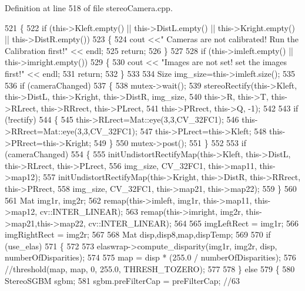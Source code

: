 Definition at line 518 of file stereo\+Camera.\+cpp.


\begin{DoxyCode}
521 \{
522     \textcolor{keywordflow}{if} (this->Kleft.empty() || this->DistL.empty() || this->Kright.empty() || this->DistR.empty())
523     \{
524         cout <<\textcolor{stringliteral}{" Cameras are not calibrated! Run the Calibration first!"} << endl;
525         \textcolor{keywordflow}{return};
526     \}
527 
528     \textcolor{keywordflow}{if} (this->imleft.empty() || this->imright.empty())
529     \{
530         cout << \textcolor{stringliteral}{"Images are not set! set the images first!"} << endl;
531         \textcolor{keywordflow}{return};
532     \}
533 
534     Size img\_size=this->imleft.size();
535 
536     \textcolor{keywordflow}{if} (cameraChanged)
537     \{
538         mutex->wait();
539         stereoRectify(this->Kleft, this->DistL, this->Kright, this->DistR, img\_size,
540                       this->R, this->T, this->RLrect, this->RRrect, this->PLrect,
541                       this->PRrect, this->Q, -1);
542 
543         \textcolor{keywordflow}{if} (!rectify)
544         \{
545             this->RLrect=Mat::eye(3,3,CV\_32FC1);
546             this->RRrect=Mat::eye(3,3,CV\_32FC1);
547             this->PLrect=this->Kleft;
548             this->PRrect=this->Kright;
549         \}
550         mutex->post();
551     \}
552 
553     \textcolor{keywordflow}{if} (cameraChanged)
554     \{
555         initUndistortRectifyMap(this->Kleft, this->DistL, this->RLrect, this->PLrect,
556                                 img\_size, CV\_32FC1, this->map11, this->map12);
557         initUndistortRectifyMap(this->Kright,  this->DistR, this->RRrect, this->PRrect,
558                                 img\_size, CV\_32FC1, this->map21, this->map22);
559     \}
560     
561     Mat img1r, img2r;
562     remap(this->imleft, img1r, this->map11, this->map12, cv::INTER\_LINEAR);
563     remap(this->imright, img2r, this->map21,this->map22, cv::INTER\_LINEAR);
564 
565     imgLeftRect = img1r;
566     imgRightRect = img2r;
567 
568     Mat disp,disp8,map,dispTemp;
569 
570     \textcolor{keywordflow}{if} (use\_elas)
571     \{
572         
573         elaswrap->compute\_disparity(img1r, img2r, disp, numberOfDisparities);
574 
575         map = disp * (255.0 / numberOfDisparities);
576         \textcolor{comment}{//threshold(map, map, 0, 255.0, THRESH\_TOZERO);}
577 
578     \} \textcolor{keywordflow}{else}
579     \{
580         StereoSGBM sgbm;
581         sgbm.preFilterCap =         preFilterCap; \textcolor{comment}{//63}

\end{DoxyCode}
